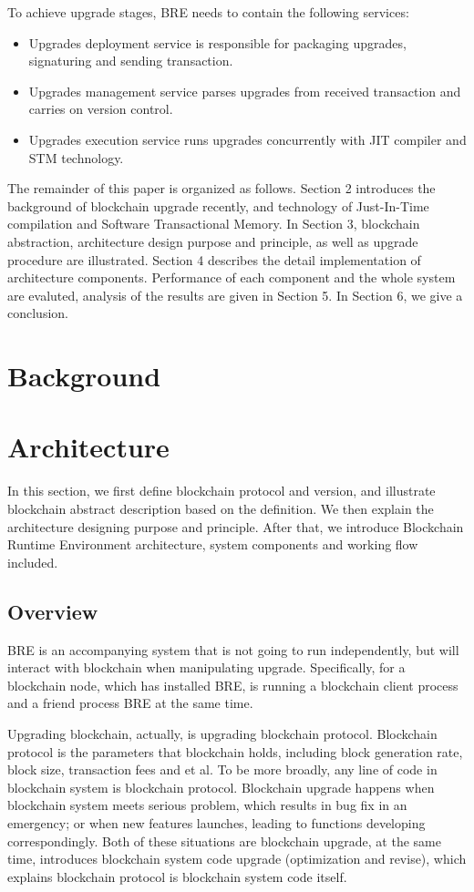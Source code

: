 \documentclass[sigplan,screen]{acmart}
\begin{document}
To achieve upgrade stages, BRE needs to contain the following services:
\begin{itemize}
  \item Upgrades deployment service is responsible for packaging upgrades,
    signaturing and sending transaction.
  \item Upgrades management service parses upgrades from received transaction
    and carries on version control.
  \item Upgrades execution service runs upgrades concurrently with JIT compiler
    and STM technology.
\end{itemize}

The remainder of this paper is organized as follows. Section 2 introduces the
background of blockchain upgrade recently, and technology of Just-In-Time
compilation and Software Transactional Memory. In Section 3, blockchain
abstraction, architecture design purpose and principle, as well as upgrade
procedure are illustrated. Section 4 describes the detail implementation of
architecture components. Performance of each component and the whole system are
evaluted, analysis of the results are given in Section 5. In Section 6, we give
a conclusion.

\section{Background}

\section{Architecture}
In this section, we first define blockchain protocol and version, and illustrate
blockchain abstract description based on the definition. We then explain the
architecture designing purpose and principle. After that, we introduce Blockchain
Runtime Environment architecture, system components and working flow included.

\subsection{Overview}
BRE is an accompanying system that is not going to run independently,
but will interact with blockchain when manipulating upgrade.
Specifically, for a blockchain node, which has installed BRE, is running a
blockchain client process and a friend process BRE at the same time.

Upgrading blockchain, actually, is upgrading blockchain protocol.
Blockchain protocol is the parameters that blockchain holds, including block
generation rate, block size, transaction fees and et al. To be
more broadly, any line of code in blockchain system is blockchain protocol.
Blockchain upgrade happens when blockchain system meets serious problem,
which results in bug fix in an emergency; or when new features launches,
leading to functions developing correspondingly. Both of these situations
are blockchain upgrade, at the same time, introduces blockchain system code
upgrade (optimization and revise), which explains blockchain protocol is
blockchain system code itself.
\end{document}
